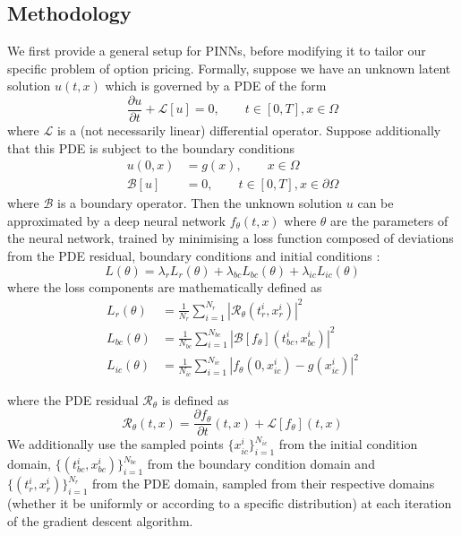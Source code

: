 \subsection{Methodology}
We first provide a general setup for PINNs, before modifying it to tailor our specific problem of option pricing. Formally, suppose we have an unknown latent solution $u(t, x)$ which is governed by a PDE of the form
\begin{equation}
    \frac{\partial u}{\partial t} + \mathcal L[u] = 0, \qquad t \in [0, T], x \in \Omega
\end{equation}
where $\mathcal L$ is a (not necessarily linear) differential operator. Suppose additionally that this PDE is subject to the boundary conditions
\begin{align}
    u(0, x) &= g(x), \qquad x \in \Omega \\
    \mathcal B[u] &= 0, \qquad t \in [0, T], x \in \partial \Omega
\end{align}
where $\mathcal B$ is a boundary operator. Then the unknown solution $u$ can be approximated by a deep neural network $f_\theta(t, x)$ where $\theta$ are the parameters of the neural network, trained by minimising a loss function composed of deviations from the PDE residual, boundary conditions and initial conditions \cite{wang2023expert}:
\begin{equation}
    L(\theta) = \lambda_{r}L_{r}(\theta) + \lambda_{bc}L_{bc}(\theta) + \lambda_{ic}L_{ic}(\theta)
\end{equation}
where the loss components are mathematically defined as
\begin{align}
    L_{r}(\theta) &= \frac{1}{N_r}\sum_{i=1}^{N_r} \left| \mathcal R_\theta(t_r^i, x_r^i) \right|^2 \\
    L_{bc}(\theta) &= \frac{1}{N_{bc}} \sum_{i=1}^{N_{bc}} \left| \mathcal B[f_\theta](t_{bc}^i, x_{bc}^i) \right|^2 \\
    L_{ic}(\theta) &= \frac{1}{N_{ic}} \sum_{i=1}^{N_{ic}} \left| f_\theta(0, x_{ic}^i) - g(x_{ic}^i) \right|^2
\end{align}

where the PDE residual $\mathcal R_\theta$ is defined as
\begin{equation}
    \mathcal R_\theta(t, x) = \frac{\partial f_\theta}{\partial t}(t, x) + \mathcal L[f_\theta](t, x)
\label{eq:pde_residual}
\end{equation}
We additionally use the sampled points $\{x_{ic}^i\}_{i=1}^{N_{ic}}$ from the initial condition domain, $\{(t_{bc}^i, x_{bc}^i)\}_{i=1}^{N_{bc}}$ from the boundary condition domain and $\{(t_r^i, x_r^i)\}_{i=1}^{N_r}$ from the PDE domain, sampled from their respective domains (whether it be uniformly or according to a specific distribution) at each iteration of the gradient descent algorithm.

